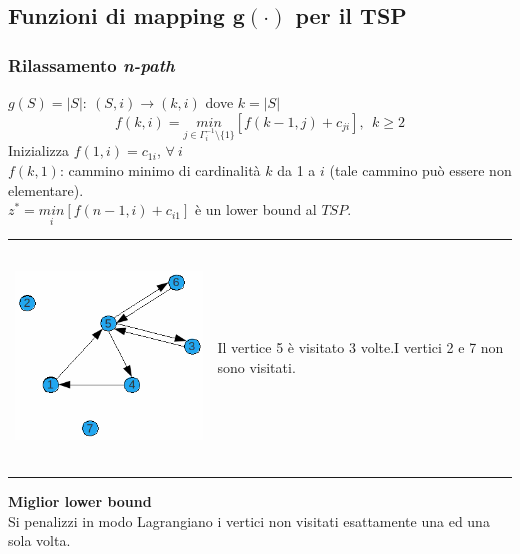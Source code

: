 \subsection{Funzioni di mapping $\boldsymbol{g(\cdot)}$ per il TSP}
\subsubsection{Rilassamento \textit{n-path}}
$g(S)=|S|:\ (S,i)\rightarrow(k,i)$ dove $k=|S|$
\begin{equation}
	f(k,i)=\underset{j\in\Gamma^{-1}_{i}\setminus\{1\}}{min}[f(k-1,j)+c_{ji}],\ \ k\ge 2
\end{equation}
Inizializza $f(1,i)=c_{1i}$, $\forall\ i$\\
$f(k,1)$: cammino minimo di cardinalità $k$ da 1 a $i$ (tale cammino può essere non elementare).\\
$z^{*}=\underset{i}{min}[f(n-1,i)+c_{i1}]$ è un lower bound al $TSP$.\\

\begin{table}[!h]
	\begin{tabular}{m{8cm} m{5cm}}
		\includegraphics[height=6cm]{images/graph47.png} & Il vertice 5 è visitato 3 volte.\newline I vertici 2 e 7 non sono visitati.
	\end{tabular}
\end{table}
\textbf{Miglior lower bound}\\
Si penalizzi in modo Lagrangiano i vertici non visitati esattamente una ed una sola volta.

